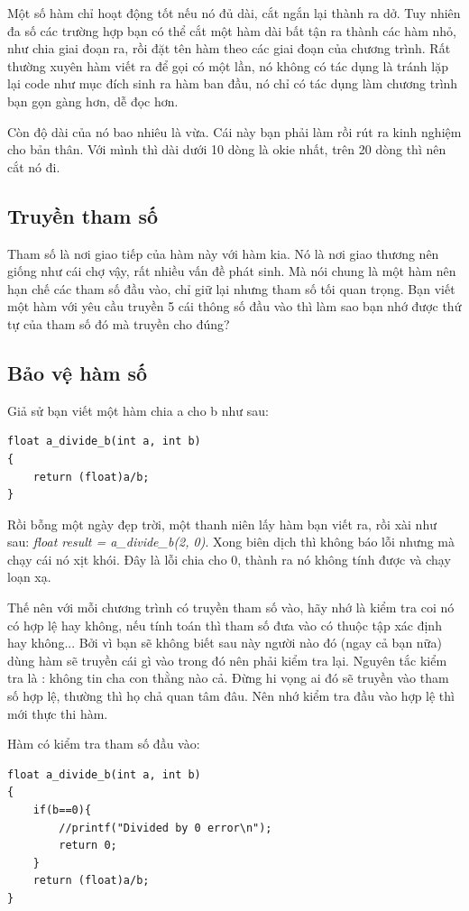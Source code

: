 Một số hàm chỉ hoạt động tốt nếu nó đủ dài, cắt ngắn lại thành ra dở. Tuy nhiên đa số các trường hợp bạn có thể cắt một hàm dài bất tận ra thành các hàm nhỏ, như chia giai đoạn ra, rồi đặt tên hàm theo các giai đoạn của chương trình. Rất thường xuyên hàm viết ra để gọi có một lần, nó không có tác dụng là tránh lặp lại code như mục đích sinh ra hàm ban đầu, nó chỉ có tác dụng làm chương trình bạn gọn gàng hơn, dễ đọc hơn.

Còn độ dài của nó bao nhiêu là vừa. Cái này bạn phải làm rồi rút ra kinh nghiệm cho bản thân. Với mình thì dài dưới 10 dòng là okie nhất, trên 20 dòng thì nên cắt nó đi.
\subsection{Truyền tham số}

Tham số là nơi giao tiếp của hàm này với hàm kia. Nó là nơi giao thương nên giống như cái chợ vậy, rất nhiều vấn đề phát sinh. Mà nói chung là một hàm nên hạn chế các tham số đầu vào, chỉ giữ lại nhưng tham số tối quan trọng. Bạn viết một hàm với yêu cầu truyền 5 cái thông số đầu vào thì làm sao bạn nhớ được thứ tự của tham số đó mà truyền cho đúng?
\subsection{Bảo vệ hàm số}

Giả sử bạn viết một hàm chia a cho b như sau:
\begin{lstlisting}
float a_divide_b(int a, int b)
{
	return (float)a/b;
}
\end{lstlisting}


Rồi bỗng một ngày đẹp trời, một thanh niên lấy hàm bạn viết ra, rồi xài như sau: \textit{float result = a\_divide\_b(2, 0)}. Xong biên dịch thì không báo lỗi nhưng mà chạy cái nó xịt khói. Đây là lỗi chia cho 0, thành ra nó không tính được và chạy loạn xạ.

Thế nên với mỗi chương trình có truyền tham số vào, hãy nhớ là kiểm tra coi nó có hợp lệ hay không, nếu tính toán thì tham số đưa vào có thuộc tập xác định hay không... Bởi vì bạn sẽ không biết sau này người nào đó (ngay cả bạn nữa) dùng hàm sẽ truyền cái gì vào trong đó nên phải kiểm tra lại. Nguyên tắc kiểm tra là : không tin cha con thằng nào cả. Đừng hi vọng ai đó sẽ truyền vào tham số hợp lệ, thường thì họ chả quan tâm đâu. Nên nhớ kiểm tra đầu vào hợp lệ thì mới thực thi hàm.

Hàm có kiểm tra tham số đầu vào:
\begin{lstlisting}
float a_divide_b(int a, int b)
{
	if(b==0){
		//printf("Divided by 0 error\n");
		return 0;
	}
	return (float)a/b;
}
\end{lstlisting}

